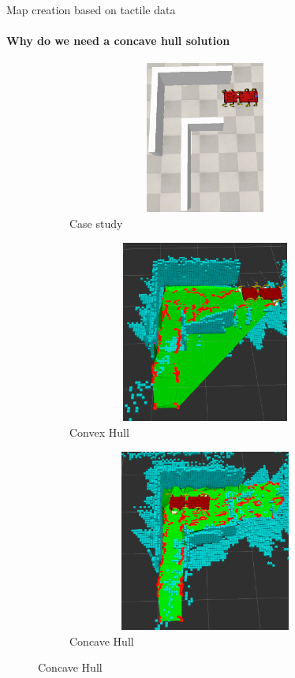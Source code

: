 \documentclass[aspectratio=169]{beamer}
\begin{document}
\begin{frame}[t]{Map creation based on tactile data}
    \framesubtitle{Why do we need a concave hull solution}
    \vspace{-15pt}
    \begin{figure}[H]
        \begin{subfigure}{0.3\textwidth}
            \centering\includegraphics[height=5cm,width=1\textwidth,keepaspectratio]{convex_terr.png}
            \caption*{Case study}
            \label{fig:convex_terr.png}
        \end{subfigure}
        \hfill
        \begin{subfigure}{0.33\textwidth}
            \centering\includegraphics[height=6cm,width=1\textwidth,keepaspectratio]{conv_convex.png}
            \caption*{Convex Hull}
            \label{fig:conv_convex.png}
        \end{subfigure}
        \hfill
        \begin{subfigure}{0.33\textwidth}
            \centering\includegraphics[height=6cm,width=1\textwidth,keepaspectratio]{conv_concave.png}
            \caption*{Concave Hull}
            \label{fig:conv_concave.png}
        \end{subfigure}

    \end{figure}
\end{frame}
\end{document}
